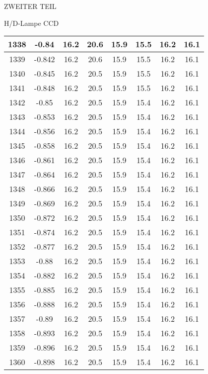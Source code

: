 \begin{appendix}
\begin{chapter}{ZWEITER TEIL}
\begin{section}{H/D-Lampe CCD}
\begin{scriptsize}
\begin{longtable}[htbp]{|c|c|c|c|c|c|c|c|}
            1338 & -0.84 & 16.2 & 20.6 & 15.9 & 15.5 & 16.2 & 16.1 \\ \hline
            1339 & -0.842 & 16.2 & 20.6 & 15.9 & 15.5 & 16.2 & 16.1 \\ \hline
            1340 & -0.845 & 16.2 & 20.5 & 15.9 & 15.5 & 16.2 & 16.1 \\ \hline
            1341 & -0.848 & 16.2 & 20.5 & 15.9 & 15.5 & 16.2 & 16.1 \\ \hline
            1342 & -0.85 & 16.2 & 20.5 & 15.9 & 15.4 & 16.2 & 16.1 \\ \hline
            1343 & -0.853 & 16.2 & 20.5 & 15.9 & 15.4 & 16.2 & 16.1 \\ \hline
            1344 & -0.856 & 16.2 & 20.5 & 15.9 & 15.4 & 16.2 & 16.1 \\ \hline
            1345 & -0.858 & 16.2 & 20.5 & 15.9 & 15.4 & 16.2 & 16.1 \\ \hline
            1346 & -0.861 & 16.2 & 20.5 & 15.9 & 15.4 & 16.2 & 16.1 \\ \hline
            1347 & -0.864 & 16.2 & 20.5 & 15.9 & 15.4 & 16.2 & 16.1 \\ \hline
            1348 & -0.866 & 16.2 & 20.5 & 15.9 & 15.4 & 16.2 & 16.1 \\ \hline
            1349 & -0.869 & 16.2 & 20.5 & 15.9 & 15.4 & 16.2 & 16.1 \\ \hline
            1350 & -0.872 & 16.2 & 20.5 & 15.9 & 15.4 & 16.2 & 16.1 \\ \hline
            1351 & -0.874 & 16.2 & 20.5 & 15.9 & 15.4 & 16.2 & 16.1 \\ \hline
            1352 & -0.877 & 16.2 & 20.5 & 15.9 & 15.4 & 16.2 & 16.1 \\ \hline
            1353 & -0.88 & 16.2 & 20.5 & 15.9 & 15.4 & 16.2 & 16.1 \\ \hline
            1354 & -0.882 & 16.2 & 20.5 & 15.9 & 15.4 & 16.2 & 16.1 \\ \hline
            1355 & -0.885 & 16.2 & 20.5 & 15.9 & 15.4 & 16.2 & 16.1 \\ \hline
            1356 & -0.888 & 16.2 & 20.5 & 15.9 & 15.4 & 16.2 & 16.1 \\ \hline
            1357 & -0.89 & 16.2 & 20.5 & 15.9 & 15.4 & 16.2 & 16.1 \\ \hline
            1358 & -0.893 & 16.2 & 20.5 & 15.9 & 15.4 & 16.2 & 16.1 \\ \hline
            1359 & -0.896 & 16.2 & 20.5 & 15.9 & 15.4 & 16.2 & 16.1 \\ \hline
            1360 & -0.898 & 16.2 & 20.5 & 15.9 & 15.4 & 16.2 & 16.1 \\ \hline

\end{longtable}
\end{scriptsize}
\end{section}
\end{chapter}
\end{appendix}
